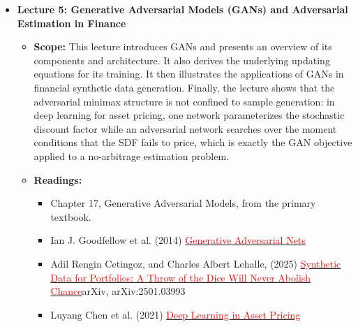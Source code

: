 \documentclass[11pt]{article}
\begin{document}
\begin{itemize}
\item \textbf{Lecture 5: Generative Adversarial Models (GANs) and Adversarial Estimation in Finance}
  \begin{itemize}
    \item \textbf{Scope:} This lecture introduces GANs and presents an overview of its
      components and architecture. It also derives the underlying updating equations
      for its training. It then illustrates the applications of GANs in financial
      synthetic data generation. Finally, the lecture shows that the adversarial
      minimax structure is not confined to sample generation: in deep learning for
      asset pricing, one network parameterizes the stochastic discount factor while
      an adversarial network searches over the moment conditions that the SDF fails
      to price, which is exactly the GAN objective applied to a no-arbitrage
      estimation problem.
    \item \textbf{Readings:}
      \begin{itemize}
        \item Chapter 17, Generative Adversarial Models, from the primary textbook.
        \item Ian J. Goodfellow et al. (2014) \href{https://arxiv.org/pdf/1406.2661}{\textcolor{red}{Generative Adversarial Nets}}
        \item Adil Rengin Cetingoz, and Charles Albert Lehalle, (2025) \href{https://arxiv.org/pdf/2501.03993}{\textcolor{red}{Synthetic Data for Portfolios: A Throw of the Dice Will Never Abolish Chance}}arXiv, arXiv:2501.03993
        \item Luyang Chen et al. (2021) \href{https://arxiv.org/pdf/1904.00745}{\textcolor{red}{Deep Learning in Asset Pricing}}
      \end{itemize}
  \end{itemize}


\end{itemize}
\end{document}
